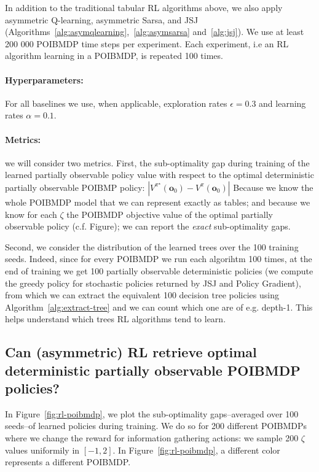 In addition to the traditional tabular RL algorithms above, we also apply asymmetric Q-learning, asymmetric Sarsa, and JSJ (Algorithms~\ref{alg:asymqlearning},~\ref{alg:asymsarsa} and~\ref{alg:jsj}).
We use at least 200 000 POIBMDP time steps per experiment. Each experiment, i.e an RL algorithm learning in a POIBMDP, is repeated 100 times.  

\paragraph{Hyperparameters:} For all baselines we use, when applicable, exploration rates $\epsilon=0.3$ and learning rates $\alpha=0.1$.

\paragraph{Metrics:} we will consider two metrics.
First, the sub-optimality gap during training of the learned partially observable policy value with respect to the optimal deterministic partially observable POIBMP policy: $|V^\pi^{\star}(\boldsymbol{o}_0) - V^\pi(\boldsymbol{o}_0)|$
Because we know the whole POIBMDP model that we can represent exactly as tables; and because we know for each $\zeta$ the POIBMDP objective value of the optimal partially observable policy (c.f. Figure); we can report the \textit{exact} sub-optimality gaps.

Second, we consider the distribution of the learned trees over the 100 training seeds.
Indeed, since for every POIBMDP we run each algorihtm 100 times, at the end of training we get 100 partially observable deterministic policies (we compute the greedy policy for stochastic policies returned by JSJ and Policy Gradient), from which we can extract the equivalent 100 decision tree policies using Algorithm~\ref{alg:extract-tree} and we can count which one are of e.g. depth-1.
This helps understand which trees RL algorithms tend to learn.

\subsection{Can (asymmetric) RL retrieve optimal deterministic partially observable POIBMDP policies?}

In Figure~\ref{fig:rl-poibmdp}, we plot the sub-optimality gaps--averaged over 100 seeds--of learned policies during training.
We do so for 200 different POIBMDPs where we change the reward for information gathering actions: we sample 200 $\zeta$ values uniformily in $[-1, 2]$.
In Figure~\ref{fig:rl-poibmdp}, a different color represents a different POIBMDP.

